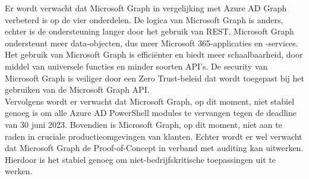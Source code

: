 \begin{comment}

Hier beschrijf je welke resultaten je verwacht. Als je metingen en simulaties uitvoert, kan je hier al mock-ups maken van de grafieken samen met de verwachte conclusies. Benoem zeker al je assen en de onderdelen van de grafiek die je gaat gebruiken. Dit zorgt ervoor dat je concreet weet welk soort data je moet verzamelen en hoe je die moet meten.

Wat heeft de doelgroep van je onderzoek aan het resultaat? Op welke manier zorgt jouw bachelorproef voor een meerwaarde?

Hier beschrijf je wat je verwacht uit je onderzoek, met de motivatie waarom. Het is \textbf{niet} erg indien uit je onderzoek andere resultaten en conclusies vloeien dan dat je hier beschrijft: het is dan juist interessant om te onderzoeken waarom jouw hypothesen niet overeenkomen met de resultaten.

\end{comment}

Er wordt verwacht dat Microsoft Graph in vergelijking met Azure AD Graph verbeterd is op de vier onderdelen. De logica van Microsoft Graph is anders, echter is de ondersteuning langer door het gebruik van REST. Microsoft Graph ondersteunt meer data-objecten, dus meer Microsoft 365-applicaties en -services. Het gebruik van Microsoft Graph is efficiënter en biedt meer schaalbaarheid, door middel van universele functies en minder soorten API’s. De security van Microsoft Graph is veiliger door een Zero Trust-beleid dat wordt toegepast bij het gebruiken van de Microsoft Graph API. \\

Vervolgens wordt er verwacht dat Microsoft Graph, op dit moment, niet stabiel genoeg is om alle Azure AD PowerShell modules te vervangen tegen de deadline van 30 juni 2023. Bovendien is Microsoft Graph, op dit moment, niet aan te raden in cruciale productieomgevingen van klanten. Echter wordt er wel verwacht dat Microsoft Graph de Proof-of-Concept in verband met auditing kan uitwerken. Hierdoor is het stabiel genoeg om niet-bedrijfskritische toepassingen uit te werken.
